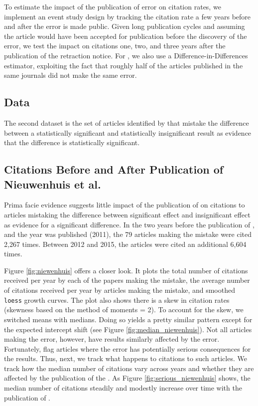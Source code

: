 \documentclass[12pt, letterpaper]{article}
\begin{document}
To estimate the impact of the publication of error on citation rates, we implement an event study design by tracking the citation rate a few years before and after the error is made public. Given long publication cycles and assuming the article would have been accepted for publication before the discovery of the error, we test the impact on citations one, two, and three years after the publication of the retraction notice. For \citet{nieuwenhuis2011}, we also use a Difference-in-Differences estimator, exploiting the fact that roughly half of the articles published in the same journals did not make the same error. 

\subsection{Data}
The second dataset is the set of articles identified by \citet{nieuwenhuis2011} that mistake the difference between a statistically significant and statistically insignificant result as evidence that the difference is statistically significant.

\subsection{Citations Before and After Publication of Nieuwenhuis et al.}

Prima facie evidence suggests little impact of the publication of \citet{nieuwenhuis2011} on citations to articles mistaking the difference between significant effect and insignificant effect as evidence for a significant difference. In the two years before the publication of \citet{nieuwenhuis2011}, and the year \citet{nieuwenhuis2011} was published (2011), the 79 articles making the mistake were cited 2,267 times. Between 2012 and 2015, the articles were cited an additional 6,604 times.

Figure \ref{fig:niewenhuis} offers a closer look. It plots the total number of citations received per year by each of the papers making the mistake, the average number of citations received per year by articles making the mistake, and smoothed \texttt{loess} growth curves. The plot also shows there is a skew in citation rates (skewness based on the method of moments = 2). To account for the skew, we switched means with medians. Doing so yields a pretty similar pattern except for the expected intercept shift (see Figure \ref{fig:median_niewenhuis}). Not all articles making the error, however, have results similarly affected by the error. Fortunately, \citet{nieuwenhuis2011} flag articles where the error has potentially serious consequences for the results. Thus, next, we track what happens to citations to such articles. We track how the median number of citations vary across years and whether they are affected by the publication of the \citet{nieuwenhuis2011}. As Figure \ref{fig:serious_niewenhuis} shows, the median number of citations steadily and modestly increase over time with the publication of \citet{nieuwenhuis2011}.
\end{document}
